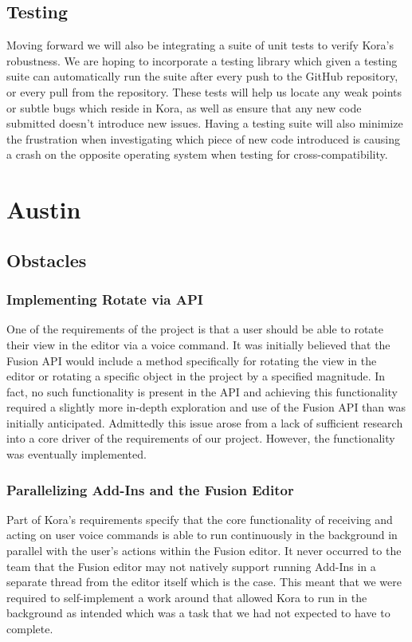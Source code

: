 \documentclass[onecolumn, draftclsnofoot,10pt, compsoc]{IEEEtran}
\begin{document}
		\subsection{Testing}
			Moving forward we will also be integrating a suite of unit tests to verify Kora's robustness.
			We are hoping to incorporate a testing library which given a testing suite can automatically run the suite after every push to the GitHub repository, or every pull from the repository.
			These tests will help us locate any weak points or subtle bugs which reside in Kora, as well as ensure that any new code submitted doesn't introduce new issues.
			Having a testing suite will also minimize the frustration when investigating which piece of new code introduced is causing a crash on the opposite operating system when testing for cross-compatibility.
			
		
	
	
	
	
	
	
\section{Austin}
    \subsection{Obstacles}
	    \subsubsection{Implementing Rotate via API}
		    One of the requirements of the project is that a user should be able to rotate their view in the editor via a voice command.
		    It was initially believed that the Fusion API would include a method specifically for rotating the view in the editor or rotating a specific object in the project by a specified magnitude.
		    In fact, no such functionality is present in the API and achieving this functionality required a slightly more in-depth exploration and use of the Fusion API than was initially anticipated.
		    Admittedly this issue arose from a lack of sufficient research into a core driver of the requirements of our project.
		    However, the functionality was eventually implemented.


   	 \subsubsection{Parallelizing Add-Ins and the Fusion Editor}
		    Part of Kora’s requirements specify that the core functionality of receiving and acting on user voice commands is able to run continuously in the background in parallel with the user’s actions within the Fusion editor.
		    It never occurred to the team that the Fusion editor may not natively support running Add-Ins in a separate thread from the editor itself which is the case.
		    This meant that we were required to self-implement a work around that allowed Kora to run in the background as intended which was a task that we had not expected to have to complete.
\end{document}
